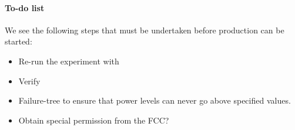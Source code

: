 \documentclass[fleqn,10pt]{article}
\begin{document}
\nocite{*}


	


\clearpage

 

\paragraph{To-do list}

We see the following steps that must be undertaken before production can be started:

\begin{itemize}
  \item Re-run the experiment with 
  \item Verify 
  \item Failure-tree to ensure that power levels can never go above specified values.
  \item Obtain special permission from the FCC?
\end{itemize}
\end{document}
